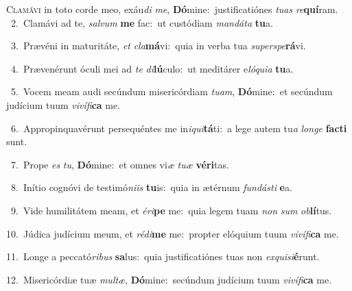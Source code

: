\lettrine{\initial\textcolor{\initialcolor}{C}}{lamávi} in toto corde meo, exáu\textit{di} \textit{me}\-, \textbf{Dó}\-mine:~\star justificatiónes \textit{tu}\-\textit{as} \textit{re}\-\textbf{quí}ram.\\
{\numbfont\textcolor{\numbcolor}{~2.}}~Clamávi ad te, \textit{sal}\-\textit{vum} \textbf{me} fac:~\star ut custódiam \textit{man}\-\textit{dá}\textit{ta} \textbf{tu}\-a.\par
{\numbfont\textcolor{\numbcolor}{~3.}}~Prævéni in maturitáte, \textit{et} \textit{cla}\-\textbf{má}vi:~\star quia in verba tua \textit{su}\-\textit{per}\textit{spe}\textbf{rá}vi.\par
{\numbfont\textcolor{\numbcolor}{~4.}}~Prævenérunt óculi mei ad \textit{te} \textit{di}\-\textbf{lú}culo:~\star ut meditárer e\-\textit{ló}\-\textit{qui}\textit{a} \textbf{tu}\-a.\par
{\numbfont\textcolor{\numbcolor}{~5.}}~Vocem meam audi secúndum misericórdiam \textit{tu}\-\textit{am}, \textbf{Dó}\-mine:~\star et secúndum judícium tuum \textit{vi}\-\textit{ví}\textit{fi}\textbf{ca} me.\par
{\numbfont\textcolor{\numbcolor}{~6.}}~Appropinquavérunt persequéntes me in\-\textit{i}\-\textit{qui}\textbf{tá}ti:~\star a lege autem tu\textit{a} \textit{lon}\-\textit{ge} \textbf{fac}\-\textbf{ti} sunt.\par
{\numbfont\textcolor{\numbcolor}{~7.}}~Prope \textit{es} \textit{tu}\-, \textbf{Dó}\-mine:~\star et omnes vi\textit{æ} \textit{tu}\-\textit{æ} \textbf{vé}\-\textbf{ri}tas.\par
{\numbfont\textcolor{\numbcolor}{~8.}}~Inítio cognóvi de testimó\-\textit{ni}\-\textit{is} \textbf{tu}\-is:~\star quia in ætérnum \textit{fun}\-\textit{dás}\textit{ti} \textbf{e}\-a.\par
{\numbfont\textcolor{\numbcolor}{~9.}}~Vide humilitátem meam, et \textit{é}\-\textit{ri}\textbf{pe} me:~\star quia legem tuam \textit{non} \textit{sum} \textit{ob}\-\textbf{lí}tus.\par
{\numbfont\textcolor{\numbcolor}{10.}}~Júdica judícium meum, et \textit{réd}\-\textit{i}\textbf{me} me:~\star propter elóquium tuum \textit{vi}\-\textit{ví}\textit{fi}\textbf{ca} me.\par
{\numbfont\textcolor{\numbcolor}{11.}}~Longe a peccató\-\textit{ri}\-\textit{bus} \textbf{sa}\-lus:~\star quia justificatiónes tuas non \textit{ex}\-\textit{qui}\textit{si}\textbf{é}runt.\par
{\numbfont\textcolor{\numbcolor}{12.}}~Misericórdiæ tuæ \textit{mul}\-\textit{tæ}, \textbf{Dó}\-mine:~\star secúndum judícium tuum \textit{vi}\-\textit{ví}\textit{fi}\textbf{ca} me.\par
